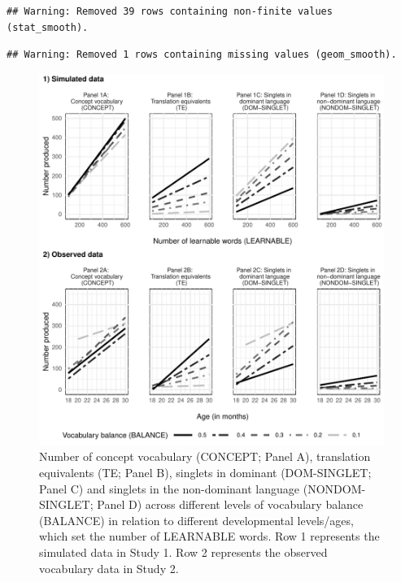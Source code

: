 \documentclass[
  english,
  ,man,floatsintext]{apa6}
\begin{document}
\begin{verbatim}
## Warning: Removed 39 rows containing non-finite values (stat_smooth).
\end{verbatim}

\begin{verbatim}
## Warning: Removed 1 rows containing missing values (geom_smooth).
\end{verbatim}

\begin{figure}[H]

{\centering \includegraphics[width=1\linewidth]{paper_TE_bilingual_vocabulary_model_files/figure-latex/fig2-1} 

}

\caption{Number of concept vocabulary (CONCEPT; Panel A), translation equivalents (TE; Panel B), singlets in dominant (DOM-SINGLET; Panel C) and singlets in the non-dominant language (NONDOM-SINGLET; Panel D) across different levels of vocabulary balance (BALANCE) in relation to different developmental levels/ages, which set the number of LEARNABLE words. Row 1 represents the simulated data in Study 1. Row 2 represents the observed vocabulary data in Study 2.}\label{fig:fig2}
\end{figure}
\end{document}
